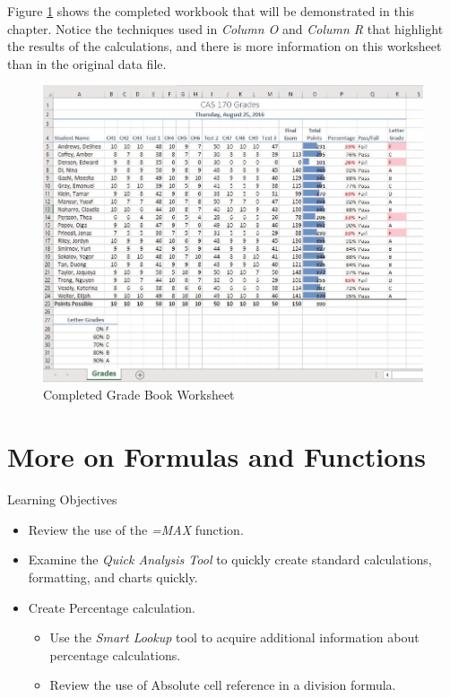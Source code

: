 Figure \ref{03:fig01} shows the completed workbook that will be demonstrated in this chapter. Notice the techniques used in \textit{Column O} and \textit{Column R} that highlight the results of the calculations, and there is more information on this worksheet than in the original data file.

\begin{figure}[H]
	\centering
	\includegraphics[width=\maxwidth{.95\linewidth}]{gfx/ch03_fig01}
	\caption{Completed Grade Book Worksheet}
	\label{03:fig01}
\end{figure}

\section{More on Formulas and Functions}

\begin{center}
	\begin{objbox}{Learning Objectives}
		\begin{itemize}
			\setlength{\itemsep}{0pt}
			\setlength{\parskip}{0pt}
			\setlength{\parsep}{0pt}
			
			\item Review the use of the \textit{=MAX} function.
			\item Examine the \textit{Quick Analysis Tool} to quickly create standard calculations, formatting, and charts quickly.
			\item Create Percentage calculation.

			\begin{itemize}
				\setlength{\itemsep}{0pt}
				\setlength{\parskip}{0pt}
				\setlength{\parsep}{0pt}

				\item Use the \textit{Smart Lookup} tool to acquire additional information about percentage calculations.
				\item Review the use of Absolute cell reference in a division formula.
			\end{itemize}

		\end{itemize}
	\end{objbox}
\end{center}

